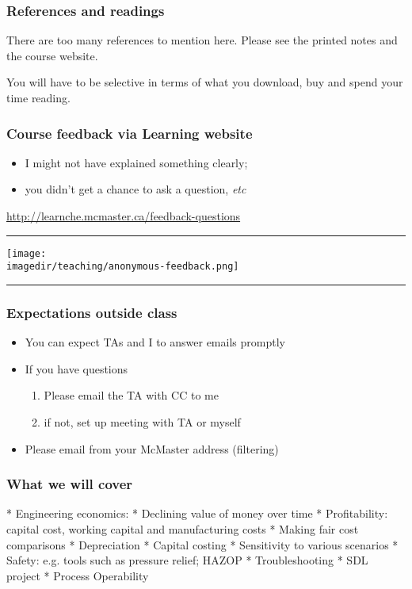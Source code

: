 \begin{frame}\frametitle{References and readings}
	\vspace{12pt}

	There are too many references to mention here. Please see the printed notes and the course website.
	
	\vspace{12pt}
	
	You will have to be selective in terms of what you download, buy and spend your time reading.
\end{frame}

\begin{frame}\frametitle{Course feedback via Learning website}
	\begin{itemize}
		\item	I might not have explained something clearly;  
		\item	you didn't get a chance to ask a question, \emph{etc}		
	\end{itemize}
	\href{http://learnche.mcmaster.ca/feedback-questions}{http://learnche.mcmaster.ca/feedback-questions}
	\vspace{12pt}
	\hrule
	\begin{center}
		\texttt{[image: \\imagedir/teaching/anonymous-feedback.png]}
	\end{center}
	\hrule
\end{frame}

\begin{frame}\frametitle{Expectations outside class}
	\begin{itemize}
		\item	You can expect TAs and I to answer emails promptly
		\item	If you have questions
			\begin{enumerate}
				\item	Please email the TA with CC to me \hfill {\tiny{\color{myOrange}{$\longleftarrow$ hopefully this solves your problem}}}
				\item	if not, set up meeting with TA or myself
			\end{enumerate}
		\item	Please email from your McMaster address (filtering)
	\end{itemize}
\end{frame}

\begin{frame}\frametitle{What we will cover}
	* Engineering economics:
		* Declining value of money over time
		* Profitability: capital cost, working capital and manufacturing costs
		* Making fair cost comparisons
		* Depreciation
		* Capital costing
		* Sensitivity to various scenarios
	* Safety: e.g. tools such as pressure relief; HAZOP	
	* Troubleshooting
	* SDL project
	* Process Operability
\end{frame}

